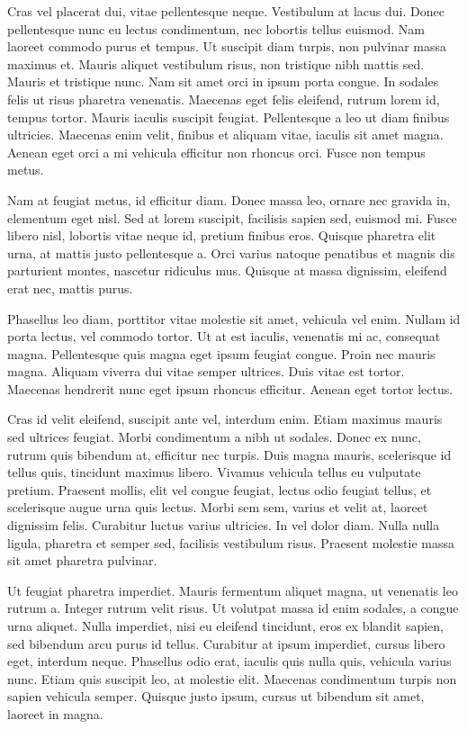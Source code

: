 Cras vel placerat dui, vitae pellentesque neque. Vestibulum at lacus dui. Donec pellentesque nunc eu lectus condimentum, nec lobortis tellus euismod. Nam laoreet commodo purus et tempus. Ut suscipit diam turpis, non pulvinar massa maximus et. Mauris aliquet vestibulum risus, non tristique nibh mattis sed. Mauris et tristique nunc. Nam sit amet orci in ipsum porta congue. In sodales felis ut risus pharetra venenatis. Maecenas eget felis eleifend, rutrum lorem id, tempus tortor. Mauris iaculis suscipit feugiat. Pellentesque a leo ut diam finibus ultricies. Maecenas enim velit, finibus et aliquam vitae, iaculis sit amet magna. Aenean eget orci a mi vehicula efficitur non rhoncus orci. Fusce non tempus metus.

Nam at feugiat metus, id efficitur diam. Donec massa leo, ornare nec gravida in, elementum eget nisl. Sed at lorem suscipit, facilisis sapien sed, euismod mi. Fusce libero nisl, lobortis vitae neque id, pretium finibus eros. Quisque pharetra elit urna, at mattis justo pellentesque a. Orci varius natoque penatibus et magnis dis parturient montes, nascetur ridiculus mus. Quisque at massa dignissim, eleifend erat nec, mattis purus.

Phasellus leo diam, porttitor vitae molestie sit amet, vehicula vel enim. Nullam id porta lectus, vel commodo tortor. Ut at est iaculis, venenatis mi ac, consequat magna. Pellentesque quis magna eget ipsum feugiat congue. Proin nec mauris magna. Aliquam viverra dui vitae semper ultrices. Duis vitae est tortor. Maecenas hendrerit nunc eget ipsum rhoncus efficitur. Aenean eget tortor lectus.

Cras id velit eleifend, suscipit ante vel, interdum enim. Etiam maximus mauris sed ultrices feugiat. Morbi condimentum a nibh ut sodales. Donec ex nunc, rutrum quis bibendum at, efficitur nec turpis. Duis magna mauris, scelerisque id tellus quis, tincidunt maximus libero. Vivamus vehicula tellus eu vulputate pretium. Praesent mollis, elit vel congue feugiat, lectus odio feugiat tellus, et scelerisque augue urna quis lectus. Morbi sem sem, varius et velit at, laoreet dignissim felis. Curabitur luctus varius ultricies. In vel dolor diam. Nulla nulla ligula, pharetra et semper sed, facilisis vestibulum risus. Praesent molestie massa sit amet pharetra pulvinar.

Ut feugiat pharetra imperdiet. Mauris fermentum aliquet magna, ut venenatis leo rutrum a. Integer rutrum velit risus. Ut volutpat massa id enim sodales, a congue urna aliquet. Nulla imperdiet, nisi eu eleifend tincidunt, eros ex blandit sapien, sed bibendum arcu purus id tellus. Curabitur at ipsum imperdiet, cursus libero eget, interdum neque. Phasellus odio erat, iaculis quis nulla quis, vehicula varius nunc. Etiam quis suscipit leo, at molestie elit. Maecenas condimentum turpis non sapien vehicula semper. Quisque justo ipsum, cursus ut bibendum sit amet, laoreet in magna.

